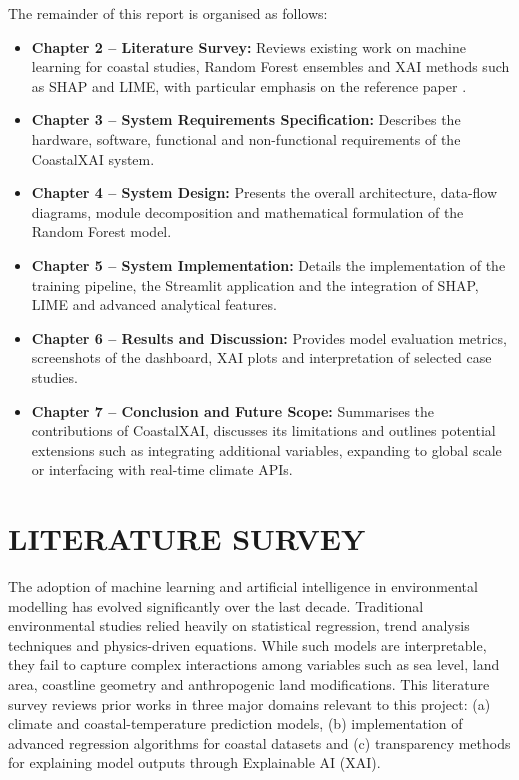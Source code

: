 \documentclass[12pt, a4paper]{article}
\begin{document}
The remainder of this report is organised as follows:

\begin{itemize}
  \item \textbf{Chapter 2 -- Literature Survey:} Reviews existing work on
  machine learning for coastal studies, Random Forest ensembles
  and XAI methods such as SHAP and LIME, with particular emphasis
  on the reference paper \cite{wang2024}.
  \item \textbf{Chapter 3 -- System Requirements Specification:} Describes
  the hardware, software, functional and non-functional
  requirements of the CoastalXAI system.
  \item \textbf{Chapter 4 -- System Design:} Presents the overall
  architecture, data-flow diagrams, module decomposition and
  mathematical formulation of the Random Forest model.
  \item \textbf{Chapter 5 -- System Implementation:} Details the
  implementation of the training pipeline, the Streamlit
  application and the integration of SHAP, LIME and advanced
  analytical features.
  \item \textbf{Chapter 6 -- Results and Discussion:} Provides model
  evaluation metrics, screenshots of the dashboard, XAI plots and
  interpretation of selected case studies.
  \item \textbf{Chapter 7 -- Conclusion and Future Scope:} Summarises the
  contributions of CoastalXAI, discusses its limitations and
  outlines potential extensions such as integrating additional
  variables, expanding to global scale or interfacing with real-time
  climate APIs.
\end{itemize}
\newpage
\section{\textbf{LITERATURE SURVEY}}

The adoption of machine learning and artificial intelligence in environmental modelling has evolved significantly over the last decade. Traditional environmental studies relied heavily on statistical regression, trend analysis techniques and physics-driven equations. While such models are interpretable, they fail to capture complex interactions among variables such as sea level, land area, coastline geometry and anthropogenic land modifications. This literature survey reviews prior works in three major domains relevant to this project: (a) climate and coastal-temperature prediction models, (b) implementation of advanced regression algorithms for coastal datasets and (c) transparency methods for explaining model outputs through Explainable AI (XAI).
\end{document}
